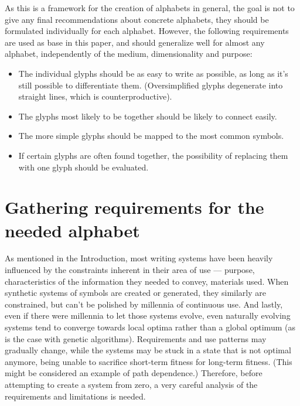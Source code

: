 \documentclass[conference]{IEEEtran}
\begin{document}
As this is a framework for the creation of alphabets in general, the goal is not to give any final recommendations about concrete alphabets, they should be formulated individually for each alphabet. However, the following requirements are used as base in this paper, and should generalize well for almost any alphabet, independently of the medium, dimensionality and purpose:
\begin{itemize}
        \item The individual glyphs should be as easy to write as possible, as long as it's still possible to differentiate them. (Oversimplified glyphs degenerate into straight lines, which is counterproductive).
        \item The glyphs most likely to be together should be likely to connect easily.
        \item The more simple glyphs should be mapped to the most common symbols.
        \item If certain glyphs are often found together, the possibility of replacing them with one glyph should be evaluated.
\end{itemize}

\section{Gathering requirements for the needed alphabet}

As mentioned in the Introduction, most writing systems have been heavily influenced by the constraints inherent in their area of use --- purpose, characteristics of the information they needed to convey, materials used. When synthetic systems of symbols are created or generated, they similarly are constrained, but can't be polished by millennia of continuous use. And lastly, even if there were millennia to let those systems evolve, even naturally evolving systems tend to converge towards local optima rather than a global optimum (as is the case with genetic algorithms). Requirements and use patterns may gradually change, while the systems may be stuck in a state that is not optimal anymore, being unable to sacrifice short-term fitness for long-term fitness. (This might be considered an example of path dependence.) Therefore, before attempting to create a system from zero, a very careful analysis of the requirements and limitations is needed.
\end{document}
